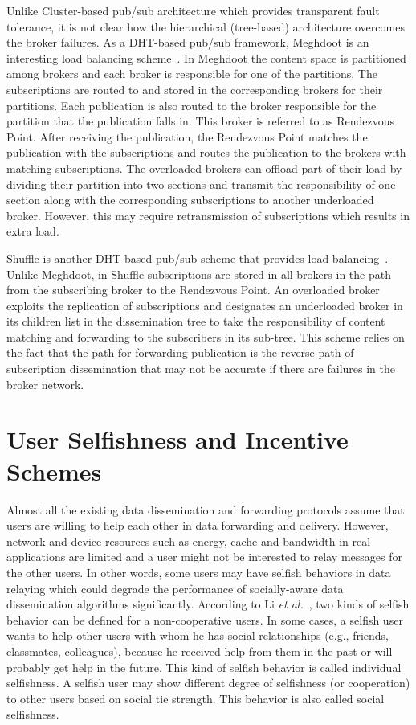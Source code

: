 Unlike Cluster-based pub/sub architecture which provides transparent fault tolerance, it is not clear how the hierarchical (tree-based) architecture overcomes the broker failures. As a DHT-based pub/sub framework, Meghdoot is an interesting load balancing scheme~\cite{AGupta2004}. In Meghdoot the content space is partitioned among brokers and each broker is responsible for one of the partitions. The subscriptions are routed to and stored in the corresponding brokers for their partitions. Each publication is also routed to the broker responsible for the partition that the publication falls in. This broker is referred to as Rendezvous Point. After receiving the publication, the Rendezvous Point matches the publication with the subscriptions and routes the publication to the brokers with matching subscriptions. The overloaded brokers can offload part of their load by dividing their partition into two sections and transmit the responsibility of one section along with the corresponding subscriptions to another underloaded broker. However, this may require retransmission of subscriptions which results in extra load.

Shuffle is another DHT-based pub/sub scheme that provides load balancing~\cite{HZhang2008}. Unlike Meghdoot, in Shuffle subscriptions are stored in all brokers in the path from the subscribing broker to the Rendezvous Point. An overloaded broker exploits the replication of subscriptions and designates an underloaded broker in its children list in the dissemination tree to take the responsibility of content matching and forwarding to the subscribers in its sub-tree. This scheme relies on the fact that the path for forwarding publication is the reverse path of subscription dissemination that may not be accurate if there are failures in the broker network.

\section{User Selfishness and Incentive Schemes}\label{Chap2_06}
Almost all the existing data dissemination and forwarding protocols assume that users are willing to help each other in data forwarding and delivery. However, network and device resources such as energy, cache and bandwidth in real applications are limited and a user might not be interested to relay messages for the other users. In other words, some users may have selfish behaviors in data relaying which could degrade the performance of socially-aware data dissemination algorithms significantly. According to Li {\it et al.}~\cite{QLi2012}, two kinds of selfish behavior can be defined for a non-cooperative users. In some cases, a selfish user wants to help other users with whom he has social relationships (e.g., friends, classmates, colleagues), because he received help from them in the past or will probably get help in the future. This kind of selfish behavior is called individual selfishness. A selfish user may show different degree of selfishness (or cooperation) to other users based on social tie strength. This behavior is also called social selfishness.

